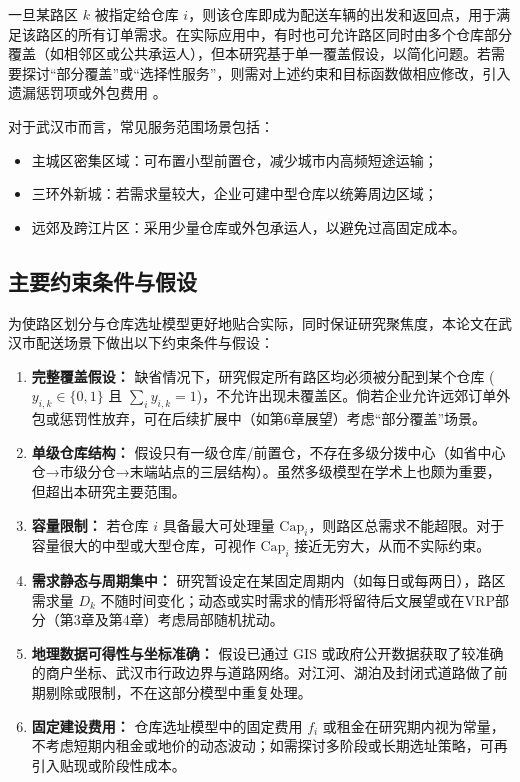 \documentclass[12pt,a4paper,twoside]{ctexbook}
\begin{document}
一旦某路区 $k$ 被指定给仓库 $i$，则该仓库即成为配送车辆的出发和返回点，用于满足该路区的所有订单需求。在实际应用中，有时也可允许路区同时由多个仓库部分覆盖（如相邻区或公共承运人），但本研究基于单一覆盖假设，以简化问题。若需要探讨“部分覆盖”或“选择性服务”，则需对上述约束和目标函数做相应修改，引入遗漏惩罚项或外包费用 \cite{Shen2007}。

对于武汉市而言，常见服务范围场景包括：
\begin{itemize}
    \item 主城区密集区域：可布置小型前置仓，减少城市内高频短途运输；
    \item 三环外新城：若需求量较大，企业可建中型仓库以统筹周边区域；
    \item 远郊及跨江片区：采用少量仓库或外包承运人，以避免过高固定成本。
\end{itemize}

\subsection{主要约束条件与假设}
为使路区划分与仓库选址模型更好地贴合实际，同时保证研究聚焦度，本论文在武汉市配送场景下做出以下约束条件与假设：
\begin{enumerate}
    \item \textbf{完整覆盖假设：} 缺省情况下，研究假定所有路区均必须被分配到某个仓库 ($y_{i,k} \in \{0,1\}$ 且 $\sum_i y_{i,k} = 1$)，不允许出现未覆盖区。倘若企业允许远郊订单外包或惩罚性放弃，可在后续扩展中（如第6章展望）考虑“部分覆盖”场景。
    \item \textbf{单级仓库结构：} 假设只有一级仓库/前置仓，不存在多级分拨中心（如省中心仓→市级分仓→末端站点的三层结构）。虽然多级模型在学术上也颇为重要，但超出本研究主要范围。
    \item \textbf{容量限制：} 若仓库 $i$ 具备最大可处理量 $\mathrm{Cap}_i$，则路区总需求不能超限。对于容量很大的中型或大型仓库，可视作 $\mathrm{Cap}_i$ 接近无穷大，从而不实际约束。
    \item \textbf{需求静态与周期集中：} 研究暂设定在某固定周期内（如每日或每两日），路区需求量 $D_k$ 不随时间变化；动态或实时需求的情形将留待后文展望或在VRP部分（第3章及第4章）考虑局部随机扰动。
    \item \textbf{地理数据可得性与坐标准确：} 假设已通过 GIS 或政府公开数据获取了较准确的商户坐标、武汉市行政边界与道路网络。对江河、湖泊及封闭式道路做了前期剔除或限制，不在这部分模型中重复处理。
    \item \textbf{固定建设费用：} 仓库选址模型中的固定费用 $f_i$ 或租金在研究期内视为常量，不考虑短期内租金或地价的动态波动；如需探讨多阶段或长期选址策略，可再引入贴现或阶段性成本。
\end{enumerate}
\end{document}
